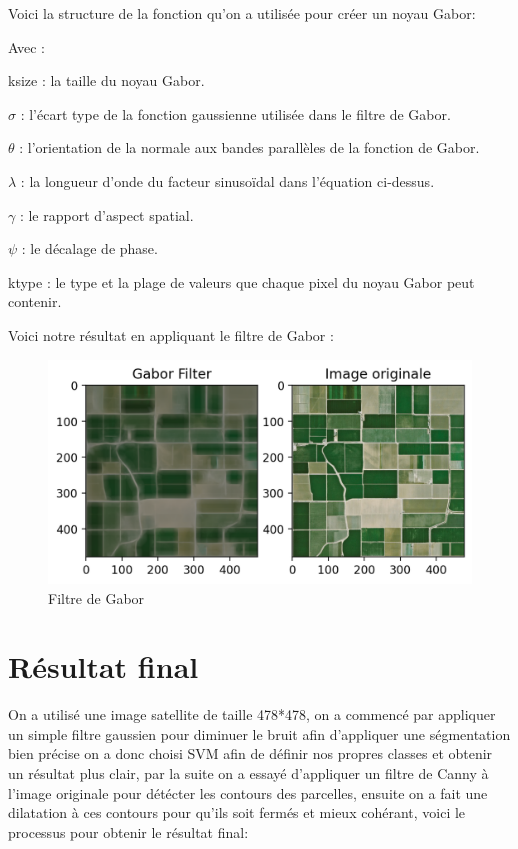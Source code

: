 \documentclass[12pt, openany]{report}
\begin{document}
Voici la structure de la fonction qu’on a utilisée pour créer un noyau Gabor: 


Avec :
\begin{mylist}
\item ksize : la taille du noyau Gabor. 
\item $\sigma$ : l'écart type de la fonction gaussienne utilisée dans le filtre de Gabor.
\item $\theta$ : l'orientation de la normale aux bandes parallèles de la fonction de Gabor.
\item $\lambda$ : la longueur d'onde du facteur sinusoïdal dans l'équation ci-dessus.
\item $\gamma$ : le rapport d'aspect spatial.
\item $\psi$ : le décalage de phase.
\item ktype : le type et la plage de valeurs que chaque pixel du noyau Gabor peut contenir.
\end{mylist}

Voici notre résultat en appliquant le filtre de Gabor : 


\begin{figure}[H]
\centering
\includegraphics[scale=1.2]{gabor_result.png}
\caption{Filtre de Gabor}
\end{figure}

\section{Résultat final}

On a utilisé une image satellite de taille 478*478, on a commencé par appliquer un simple filtre gaussien pour diminuer le bruit afin d'appliquer une ségmentation bien précise on a donc choisi SVM afin de définir nos propres classes et obtenir un résultat plus clair, par la suite on a essayé d'appliquer un filtre de Canny à l'image originale pour détécter les contours des parcelles, ensuite on a fait une dilatation à ces contours pour qu'ils soit fermés et mieux cohérant, voici le processus pour obtenir le résultat final: 
\end{document}
